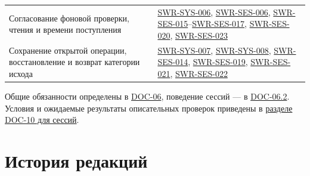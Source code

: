 \documentclass[12pt,a4paper]{article}
\begin{document}
{\begin{longtable}[]{@{}
  >{\raggedright\arraybackslash}p{}
  >{\raggedright\arraybackslash}p{}@{}}
Согласование фоновой проверки, чтения и времени поступления & {\href{../07\_Программные\_требования/DOC-06\_Программные\_требования.pdf\#swr-sys-006}{SWR-SYS-006}}, {\href{../07\_Программные\_требования/DOC-06.2\_Сессии\_задач\_и\_планировщик.pdf\#swr-ses-006}{SWR-SES-006}}, {\href{../07\_Программные\_требования/DOC-06.2\_Сессии\_задач\_и\_планировщик.pdf\#swr-ses-015}{SWR-SES-015}}--{\href{../07\_Программные\_требования/DOC-06.2\_Сессии\_задач\_и\_планировщик.pdf\#swr-ses-017}{SWR-SES-017}}, {\href{../07\_Программные\_требования/DOC-06.2\_Сессии\_задач\_и\_планировщик.pdf\#swr-ses-020}{SWR-SES-020}}, {\href{../07\_Программные\_требования/DOC-06.2\_Сессии\_задач\_и\_планировщик.pdf\#swr-ses-023}{SWR-SES-023}} \\
Сохранение открытой операции, восстановление и возврат категории исхода & {\href{../07\_Программные\_требования/DOC-06\_Программные\_требования.pdf\#swr-sys-007}{SWR-SYS-007}}, {\href{../07\_Программные\_требования/DOC-06\_Программные\_требования.pdf\#swr-sys-008}{SWR-SYS-008}}, {\href{../07\_Программные\_требования/DOC-06.2\_Сессии\_задач\_и\_планировщик.pdf\#swr-ses-014}{SWR-SES-014}}, {\href{../07\_Программные\_требования/DOC-06.2\_Сессии\_задач\_и\_планировщик.pdf\#swr-ses-019}{SWR-SES-019}}, {\href{../07\_Программные\_требования/DOC-06.2\_Сессии\_задач\_и\_планировщик.pdf\#swr-ses-021}{SWR-SES-021}}, {\href{../07\_Программные\_требования/DOC-06.2\_Сессии\_задач\_и\_планировщик.pdf\#swr-ses-022}{SWR-SES-022}} \\
\end{longtable}
}

Общие обязанности определены в {\href{../07\_Программные\_требования/DOC-06\_Программные\_требования.pdf\#doc-06-сводные-программные-требования}{DOC-06}}, поведение сессий --- в {\href{../07\_Программные\_требования/DOC-06.2\_Сессии\_задач\_и\_планировщик.pdf\#doc-062-сессии-задач-и-планировщик}{DOC-06.2}}. Условия и ожидаемые результаты описательных проверок приведены в {\href{../10\_Верификация\_и\_тестирование/DOC-10\_План\_верификации.pdf\#doc-10-верификация-сессий-задач-и-планировщика}{разделе DOC-10 для сессий}}.

\section{История редакций}\label{ux438ux441ux442ux43eux440ux438ux44f-ux440ux435ux434ux430ux43aux446ux438ux439}

\hypertarget{история-редакций}{}
\end{document}
